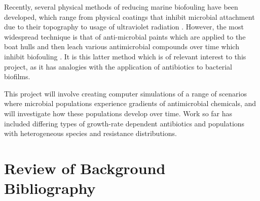 \documentclass[a4paper,12pt]{article}
\begin{document}
Recently, several physical methods of reducing marine biofouling have been developed, which range from physical coatings that inhibit microbial
attachment due to their topography \cite{bioref:non-toxic-antifouling-strat} to usage of ultraviolet radiation \cite{bioref:UV-biofilm-repellent}.
However, the most widespread technique is that of anti-microbial paints which are applied to the boat hulls and then leach various antimicrobial
compounds over time which inhibit biofouling \cite{bioref:antimicro-paint-desc}.  It is this latter method which is of relevant interest to this project, 
as it has analogies with the application of antibiotics to bacterial biofilms.

This project will involve creating computer simulations of a range of scenarios where microbial populations experience gradients of antimicrobial chemicals, and will
investigate how these populations develop over time.  Work so far has included differing types of growth-rate dependent
antibiotics and populations with heterogeneous species and resistance distributions.




% 

\section{Review of Background Bibliography}

\end{document}
